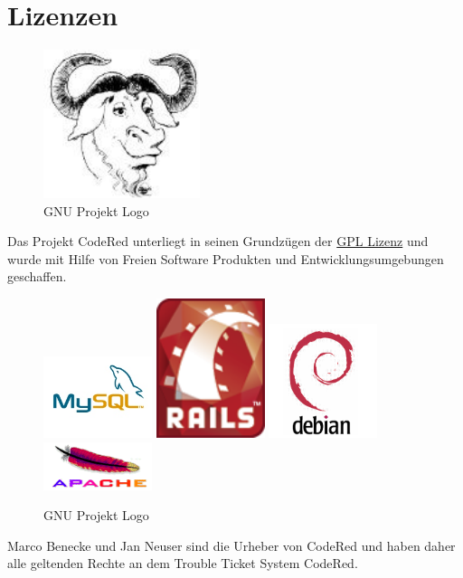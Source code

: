 \chapter{Lizenzen}  %
\label{chapter:Lizenzen}  %

\begin{figure}[h]
\begin{center}
   \includegraphics[width=130pt]{../bilder/gnu-head-sm.jpg}
   \caption{GNU Projekt Logo}
   \label{GPL Lizenz}
\end{center}
\end{figure}
Das Projekt CodeRed unterliegt in seinen Grundzügen der \href{http://de.wikipedia.org/wiki/GPL}{GPL Lizenz} und wurde mit Hilfe von Freien Software Produkten und Entwicklungsumgebungen geschaffen.\\
\begin{figure}[h]
\begin{center}
   \includegraphics[width=90pt]{../bilder/mysql.jpg}
   \includegraphics[width=90pt]{../bilder/rails.png}
   \includegraphics[width=90pt]{../bilder/debian.png}
   \includegraphics[width=90pt]{../bilder/apache.png}
   \caption{GNU Projekt Logo}
   \label{GPL Lizenz}
\end{center}
\end{figure}
Marco Benecke und Jan Neuser sind die Urheber von CodeRed und haben daher alle geltenden Rechte an dem Trouble Ticket System CodeRed.